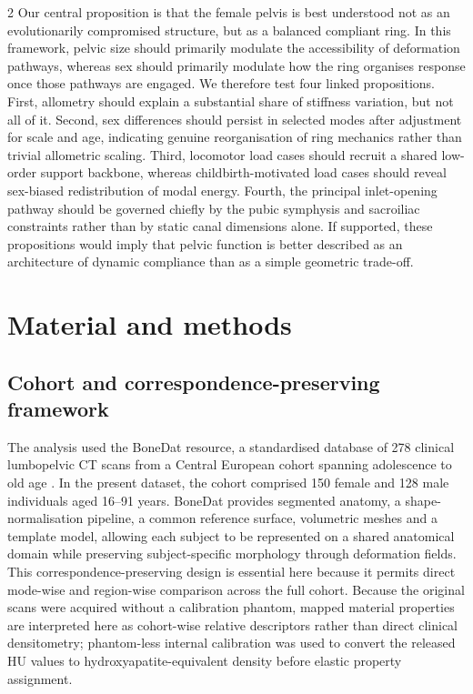 \documentclass[openacc]{rsproca_new}
\begin{document}
\begin{multicols}{2}
Our central proposition is that the female pelvis is best understood not as an evolutionarily compromised structure, but as a balanced compliant ring. In this framework, pelvic size should primarily modulate the accessibility of deformation pathways, whereas sex should primarily modulate how the ring organises response once those pathways are engaged. We therefore test four linked propositions. First, allometry should explain a substantial share of stiffness variation, but not all of it. Second, sex differences should persist in selected modes after adjustment for scale and age, indicating genuine reorganisation of ring mechanics rather than trivial allometric scaling. Third, locomotor load cases should recruit a shared low-order support backbone, whereas childbirth-motivated load cases should reveal sex-biased redistribution of modal energy. Fourth, the principal inlet-opening pathway should be governed chiefly by the pubic symphysis and sacroiliac constraints rather than by static canal dimensions alone. If supported, these propositions would imply that pelvic function is better described as an architecture of dynamic compliance than as a simple geometric trade-off.

\section{Material and methods}

\subsection{Cohort and correspondence-preserving framework}

The analysis used the BoneDat resource, a standardised database of 278 clinical lumbopelvic CT scans from a Central European cohort spanning adolescence to old age \cite{HenysKuchar2025}. In the present dataset, the cohort comprised 150 female and 128 male individuals aged 16--91 years. BoneDat provides segmented anatomy, a shape-normalisation pipeline, a common reference surface, volumetric meshes and a template model, allowing each subject to be represented on a shared anatomical domain while preserving subject-specific morphology through deformation fields. This correspondence-preserving design is essential here because it permits direct mode-wise and region-wise comparison across the full cohort. Because the original scans were acquired without a calibration phantom, mapped material properties are interpreted here as cohort-wise relative descriptors rather than direct clinical densitometry; phantom-less internal calibration was used to convert the released HU values to hydroxyapatite-equivalent density before elastic property assignment.


\end{multicols}
\end{document}
